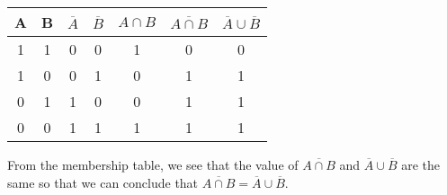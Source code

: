 \documentclass{article}
\theoremstyle{mytheoremstyle}
\theoremstyle{mytheoremstyle}
\theoremstyle{myproblemstyle}
\begin{document}
\begin{enumerate} [label = (\alph*)]
                \begin{center}
                    \begin{tabular}{|c|c|c|c|c|c|c|}
                        \hline
                        A & B & \(\overline{A}\) & \(\overline{B}\) & \(A \cap B\) & \(\overline{A \cap B}\) & \(\overline{A} \cup \overline{B}\)\\
                        \hline
                        1 & 1 & 0 & 0 & 1 & 0 & 0\\
                        \hline
                        1 & 0 & 0 & 1 & 0 & 1 & 1\\
                        \hline
                        0 & 1 & 1 & 0 & 0 & 1 & 1\\
                        \hline
                        0 & 0 & 1 & 1 & 1 & 1 & 1\\
                        \hline
                    \end{tabular}
                \end{center}
            From the membership table, we see that the value of \(\overline{A \cap B}\) and \(\overline{A} \cup \overline{B}\) are the same so that we can
            conclude that \(\overline{A \cap B} = \overline{A} \cup \overline{B}\).
        \end{enumerate}
\end{document}
